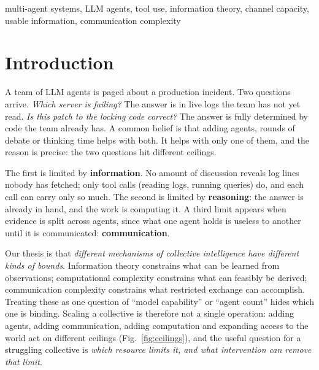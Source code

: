 \documentclass[conference]{IEEEtran}
\theoremstyle{definition}
\begin{document}
\begin{IEEEkeywords}
multi-agent systems, LLM agents, tool use, information theory, channel
capacity, usable information, communication complexity
\end{IEEEkeywords}

\section{Introduction}

A team of LLM agents is paged about a production incident. Two questions arrive.
\emph{Which server is failing?} The answer is in live logs the team has not yet
read. \emph{Is this patch to the locking code correct?} The answer is fully
determined by code the team already has. A common belief is that adding agents,
rounds of debate or thinking time helps with both. It helps with only one of
them, and the reason is precise: the two questions hit different ceilings.

The first is limited by \textbf{information}. No amount of discussion reveals
log lines nobody has fetched; only tool calls (reading logs, running queries)
do, and each call can carry only so much. The second is limited by
\textbf{reasoning}: the answer is already in hand, and the work is computing it.
A third limit appears when evidence is split across agents, since what one agent
holds is useless to another until it is communicated: \textbf{communication}.

Our thesis is that \emph{different mechanisms of collective intelligence have
different kinds of bounds}. Information theory constrains what can be learned
from observations; computational complexity constrains what can feasibly be
derived; communication complexity constrains what restricted exchange can
accomplish. Treating these as one question of ``model capability'' or ``agent
count'' hides which one is binding. Scaling a collective is therefore not a single
operation: adding agents, adding communication, adding computation and expanding
access to the world act on different ceilings (Fig.~\ref{fig:ceilings}), and the
useful question for a struggling collective is \emph{which resource limits it,
and what intervention can remove that limit}.
\end{document}

